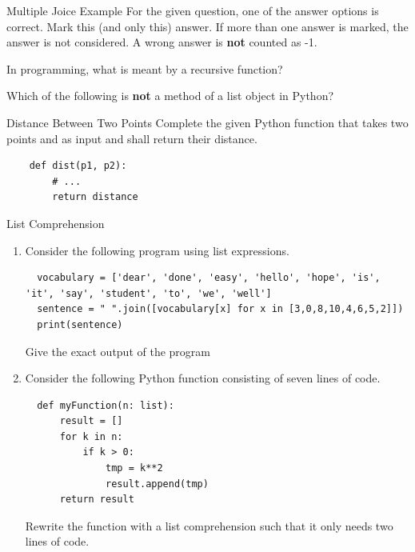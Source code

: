 \documentclass[twoside]{article}
\begin{document}
\clearpage

\begin{task}{Multiple Joice Example}{}{}
For the given question, one of the answer options is correct. Mark this (and only this) answer. If more than one answer is marked, the answer is not considered. A wrong answer is \textbf{not} counted as -1.\vspace{1cm}

  \begin{multiplechoice}{In programming, what is meant by a recursive function?}
  \end{multiplechoice}

  \begin{multiplechoice}{Which of the following is \textbf{not} a method of a list object in Python?}
  \end{multiplechoice}
\end{task}


\begin{task}{Distance Between Two Points}{}{}
Complete the given Python function  that takes two points  and  as input and shall return their distance.
\begin{lstlisting}
    def dist(p1, p2):
        # ...
        return distance
\end{lstlisting}
\end{task}

\clearpage

\begin{task}{List Comprehension}{}{}
  \begin{enumerate}
  \item{Consider the following program using list expressions.}
  \begin{lstlisting}
  vocabulary = ['dear', 'done', 'easy', 'hello', 'hope', 'is', 'it', 'say', 'student', 'to', 'we', 'well']
  sentence = " ".join([vocabulary[x] for x in [3,0,8,10,4,6,5,2]])
  print(sentence)
  \end{lstlisting}
  Give the exact output of the program 

\vspace*{6cm}


  \item{Consider the following Python function consisting of seven lines of code.}
  \begin{lstlisting}
  def myFunction(n: list):
      result = []
      for k in n:
          if k > 0:
              tmp = k**2
              result.append(tmp)
      return result
  \end{lstlisting}
  Rewrite the function with a list comprehension such that it only needs two lines of code.
  \end{enumerate}

\end{task}
\end{document}
